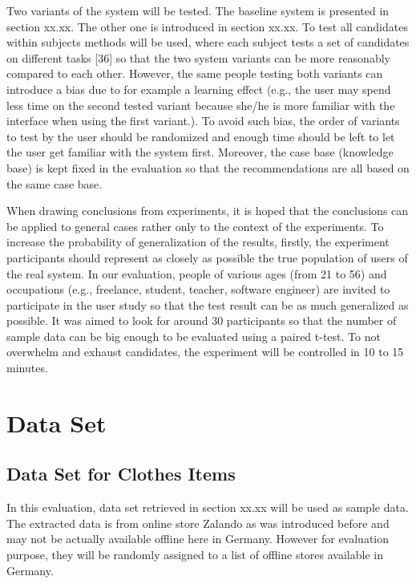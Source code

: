 Two variants of the system will be tested. The baseline system is presented in section xx.xx. The other one is introduced in section xx.xx. To test all candidates within subjects methods will be used, where each subject tests a set of candidates on different tasks [36] so that the two system variants can be more reasonably compared to each other. However, the same people testing both variants can introduce a bias due to for example a learning effect (e.g., the user may spend less time on the second tested variant because she/he is more familiar with the interface when using the first variant.). To avoid such bias, the order of variants to test by the user should be randomized and enough time should be left to let the user get familiar with the system first. Moreover, the case base (knowledge base) is kept fixed in the evaluation so that the recommendations are all based on the same case base.

When drawing conclusions from experiments, it is hoped that the conclusions can be applied to general cases rather only to the context of the experiments. To increase the probability of generalization of the results, firstly, the experiment participants should represent as closely as possible the true population of users of the real system. In our evaluation, people of various ages (from 21 to 56) and occupations (e.g., freelance, student, teacher, software engineer) are invited to participate in the user study so that the test result can be as much generalized as possible. It was aimed to look for around 30 participants so that the number of sample data can be big enough to be evaluated using a paired t-test. To not overwhelm and exhaust candidates, the experiment will be controlled in 10 to 15 minutes.

\section{Data Set} \label{sec:ds}

\subsection{Data Set for Clothes Items} \label{sec:ds_ci}

In this evaluation, data set retrieved in section xx.xx will be used as sample data. The extracted data is from online store Zalando as was introduced before and may not be actually available offline here in Germany. However for evaluation purpose, they will be randomly assigned to a list of offline stores available in Germany. 

